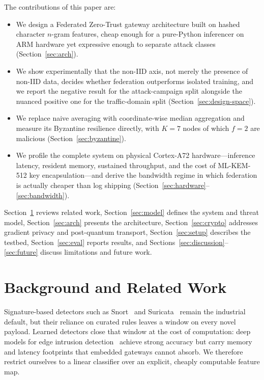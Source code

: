 \documentclass[conference]{IEEEtran}
\begin{document}
The contributions of this paper are:
\begin{itemize}
    \item We design a Federated Zero-Trust gateway architecture built on hashed character $n$-gram features, cheap enough for a pure-Python inferencer on ARM hardware yet expressive enough to separate attack classes (Section~\ref{sec:arch}).
    \item We show experimentally that the non-IID axis, not merely the presence of non-IID data, decides whether federation outperforms isolated training, and we report the negative result for the attack-campaign split alongside the nuanced positive one for the traffic-domain split (Section~\ref{sec:design-space}).
    \item We replace naive averaging with coordinate-wise median aggregation and measure its Byzantine resilience directly, with $K=7$ nodes of which $f=2$ are malicious (Section~\ref{sec:byzantine}).
    \item We profile the complete system on physical Cortex-A72 hardware---inference latency, resident memory, sustained throughput, and the cost of ML-KEM-512 key encapsulation---and derive the bandwidth regime in which federation is actually cheaper than log shipping (Section~\ref{sec:hardware}--\ref{sec:bandwidth}).
\end{itemize}

Section~\ref{sec:related} reviews related work, Section~\ref{sec:model} defines the system and threat model, Section~\ref{sec:arch} presents the architecture, Section~\ref{sec:crypto} addresses gradient privacy and post-quantum transport, Section~\ref{sec:setup} describes the testbed, Section~\ref{sec:eval} reports results, and Sections~\ref{sec:discussion}--\ref{sec:future} discuss limitations and future work.

\section{Background and Related Work}
\label{sec:related}
Signature-based detectors such as Snort~\cite{snort} and Suricata~\cite{suricata} remain the industrial default, but their reliance on curated rules leaves a window on every novel payload. Learned detectors close that window at the cost of computation: deep models for edge intrusion detection~\cite{wang2020} achieve strong accuracy but carry memory and latency footprints that embedded gateways cannot absorb. We therefore restrict ourselves to a linear classifier over an explicit, cheaply computable feature map.
\end{document}

